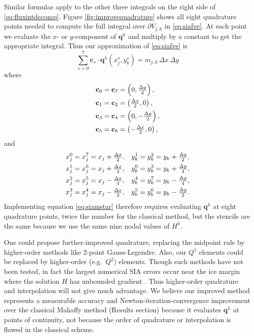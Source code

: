 \documentclass[review,letterpaper]{igs}
\newcommand\bc{\mathbf{c}}
\newcommand\bq{\mathbf{q}}
\begin{document}
Similar formulas apply to the other three integrals on the right side of \eqref{eq:fluxintdecomp}.  Figure \ref{fig:improvequadrature} shows all eight quadrature points needed to compute the full integral over $\partial V_{j,k}$ in \eqref{eq:siafve}.  At each point we evaluate the $x$- or $y$-component of $\bq^h$ and multiply by a constant to get the appropriate integral.  Thus our approximation of \eqref{eq:siafve} is
\begin{equation}
\sum_{s=0}^7 \bc_s \cdot \bq^h(x_j^s,y_k^s) = m_{j,k}\,\Delta x\,\Delta y  \label{eq:siamstar}
\end{equation}
where
\begin{align}
\bc_0 &= \bc_7 = \left(0, \tfrac{\Delta y}{2}\right),  \label{eq:cs} \\
\bc_1 &= \bc_2 = \left(\tfrac{\Delta x}{2},0\right),  \notag \\
\bc_3 &= \bc_4 = \left(0, -\tfrac{\Delta y}{2}\right),  \notag \\
\bc_5 &= \bc_6 = \left(-\tfrac{\Delta x}{2},0\right),  \notag
\end{align}
and
\begin{align}
x_j^0 &= x_j^7 = x_j + \tfrac{\Delta x}{2}, & y_k^1 &= y_k^2 = y_k + \tfrac{\Delta y}{2}, \label{eq:xjsyks} \\
x_j^1 &= x_j^6 = x_j + \tfrac{\Delta x}{4}, & y_k^0 &= y_k^3 = y_k + \tfrac{\Delta y}{4}, \notag \\
x_j^2 &= x_j^5 = x_j - \tfrac{\Delta x}{4}, & y_k^4 &= y_k^7 = y_k - \tfrac{\Delta y}{4}, \notag \\
x_j^3 &= x_j^4 = x_j - \tfrac{\Delta x}{2}, & y_k^5 &= y_k^6 = y_k - \tfrac{\Delta y}{2}. \notag
\end{align}
Implementing equation \eqref{eq:siamstar} therefore requires evaluating $\bq^h$ at eight quadrature points, twice the number for the classical method, but the stencils are the same because we use the same nine nodal values of $H^h$.

One could propose further-improved quadrature, replacing the midpoint rule by higher-order methods like 2-point Gauss-Legendre.  Also, our $Q^1$ elements could be replaced by higher-order (e.g.~$Q^2$) elements.  Though such methods have not been tested, in fact the largest numerical SIA errors occur near the ice margin where the solution $H$ has unbounded gradient \citep{Bueleretal2005}.  Thus higher-order quadrature and interpolation will not give much advantage.  We believe our improved method represents a measurable accuracy and Newton-iteration-convergence improvement over the classical Mahaffy method (Results section) because it evaluates $\bq^h$ at points of continuity, not because the order of quadrature or interpolation is flawed in the classical scheme.
\end{document}
